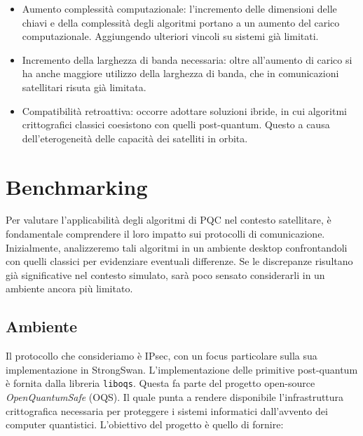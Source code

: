 \begin{itemize}
    \item Aumento complessità computazionale: l'incremento delle dimensioni delle chiavi e della complessità degli algoritmi portano a un aumento del carico computazionale. Aggiungendo ulteriori vincoli su sistemi già limitati. 
    \item Incremento della larghezza di banda necessaria: oltre all'aumento di carico si ha anche maggiore utilizzo della larghezza di banda, che in comunicazioni satellitari risuta già limitata.
    \item Compatibilità retroattiva: occorre adottare soluzioni ibride, in cui
    algo\-ritmi crittografici classici coesistono con quelli post-quantum. Questo a 
    causa dell'eterogeneità delle capacità dei satelliti in orbita.
\end{itemize}

\section{Benchmarking}

Per valutare l'applicabilità degli algoritmi di PQC
nel contesto satellitare, è fondamentale comprendere il loro impatto sui
protocolli di comunicazione. Inizialmente, analizzeremo tali algoritmi in un
ambiente desktop confrontan\-doli con quelli classici per evidenziare eventuali
differenze. Se le discrepanze risultano già significative nel contesto simulato,
sarà poco sensato considerarli in un ambiente ancora più limitato.


\subsection{Ambiente}

Il protocollo che consideriamo è IPsec, con un focus particolare sulla sua
implementazione in StrongSwan. L'implementazione delle primitive post-quantum è fornita dalla libreria \texttt{liboqs}. 
Questa fa parte del progetto open-source \textit{OpenQuantumSafe} (OQS).
Il quale punta a rendere disponibile l'infrastruttura crittografica necessaria per proteggere i sistemi informatici
dall'avvento dei computer quantistici. L'obiet\-tivo del progetto è quello di fornire:

